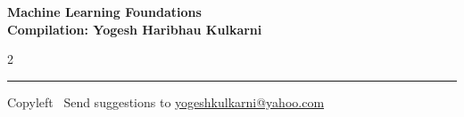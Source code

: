 \documentclass[8pt,landscape]{article}
\begin{document}
\footnotesize


\begin{center}
\Large{\textbf{Machine Learning Foundations\\ Compilation: Yogesh Haribhau Kulkarni}}
\end{center}

\begin{multicols}{2}

\end{multicols}

\rule{\linewidth}{0.25pt}
\scriptsize
Copyleft \textcopyleft\  Send suggestions to
\href{http://www.yogeshkulkarni.com}{yogeshkulkarni@yahoo.com}
\end{document}

